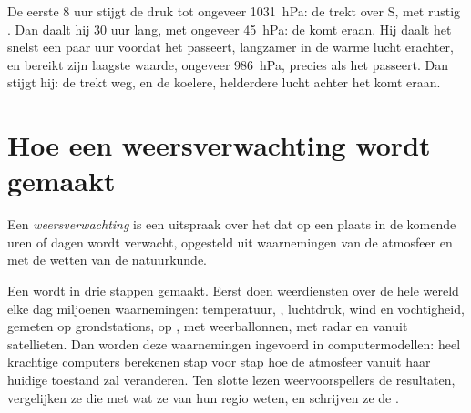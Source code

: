 \begin{example}\label{ex:g8:fronts-and-weather-maps:barogram}
De eerste 8 uur stijgt de druk tot ongeveer \qty{1031}{hPa}: de 
trekt over S, met rustig . Dan daalt hij 30 uur lang, met ongeveer
\qty{45}{hPa}: de  komt eraan. Hij daalt het snelst een paar uur
voordat het  passeert, langzamer in de warme lucht erachter, en
bereikt zijn laagste waarde, ongeveer \qty{986}{hPa}, precies als het
 passeert. Dan stijgt hij: de  trekt weg, en de koelere,
helderdere lucht achter het  komt eraan.
\end{example}

\section{Hoe een weersverwachting wordt gemaakt}

\begin{definition}[Weersverwachting]\label{def:g8:fronts-and-weather-maps:forecast}
Een \emph{weersverwachting} is een uitspraak over
het  dat op een plaats in de komende uren of dagen wordt verwacht,
opgesteld uit waarnemingen van de atmosfeer en met de wetten van de
natuurkunde.
\end{definition}

Een  wordt in drie stappen gemaakt. Eerst doen
weerdiensten over de hele wereld elke dag miljoenen waarnemingen:
temperatuur, , luchtdruk, wind en vochtigheid, gemeten op
grondstations, op , met weerballonnen, met radar en vanuit satellieten.
Dan worden deze waarnemingen ingevoerd in computermodellen: heel krachtige
computers berekenen stap voor stap hoe de atmosfeer vanuit haar huidige
toestand zal veranderen. Ten slotte lezen weervoorspellers de resultaten,
vergelijken ze die met wat ze van hun regio weten, en schrijven ze de
.

